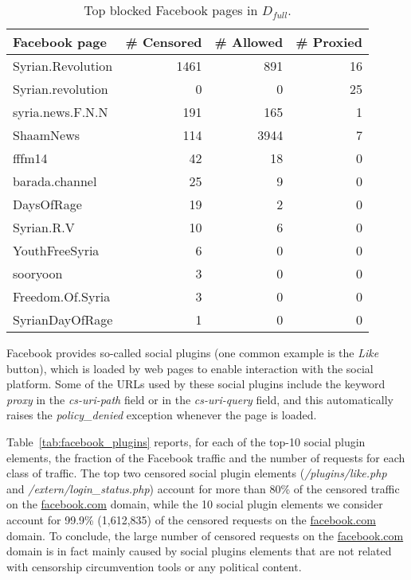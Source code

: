 \documentclass{sig-alternate-2013}
\newcommand{\descr}[1]{\smallskip\noindent{\bf #1}}
\def\df{$D_{full}$\xspace}
\newcommand{\policydenied}{\emph{policy\_denied}\xspace}
\begin{document}
\begin{table}[t!]
\small
\centering
\begin{tabular}{|l|r|r|r|} \hline
{\bf  Facebook page} &  {\bf \# Censored} & {\bf \# Allowed} &  {\bf \# Proxied} \\ \hline
 Syrian.Revolution & 1461 & 891 & 16   \\ 
 Syrian.revolution & 0 & 0 & 25   \\ 
 syria.news.F.N.N & 191 & 165 & 1   \\ 
ShaamNews & 114 & 3944 & 7   \\ 
 fffm14 & 42 & 18 & 0   \\ 
 barada.channel & 25 & 9 & 0   \\ 
DaysOfRage & 19 & 2 & 0   \\ 
Syrian.R.V & 10 & 6 & 0   \\ 
 YouthFreeSyria & 6 & 0 & 0   \\ 
 sooryoon & 3  & 0 & 0   \\ 
 Freedom.Of.Syria & 3 & 0 & 0 \\
 SyrianDayOfRage & 1 & 0 & 0 \\
\hline
\end{tabular}
\caption{Top blocked Facebook pages in \df.}
\label{tab:Filtered_facebook_pages}
\end{table} 


\descr{Social plugins.} Facebook provides so-called social plugins (one common example is the {\em Like} button), which is loaded by web pages to enable interaction with the social platform. Some of the URLs used by these social plugins include  the keyword {\em proxy} in the  \emph{cs-uri-path} field 
or in the  \emph{cs-uri-query} field, 
and this automatically raises the  \policydenied exception whenever the page is loaded.


Table~\ref{tab:facebook_plugins} reports, for each of the top-10 social plugin elements, the fraction of the Facebook traffic and the number of requests for each class of traffic. The top two censored social plugin elements (\emph{/plugins/like.php} and \emph{/extern/login\_status.php}) account for more than 80\% of the censored traffic on the \url{facebook.com} domain, while the 10 social plugin elements we consider account for 99.9\% (1,612,835) of the censored requests on the \url{facebook.com} domain.
To conclude, the large number of censored requests on the \url{facebook.com} domain is in fact mainly caused by social plugins elements that are not related with censorship circumvention tools or any political content.
\end{document}
